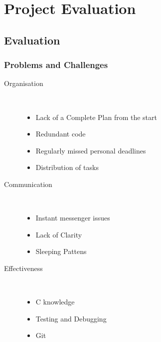 \documentclass{beamer}
\begin{document}
\section{Project Evaluation}
\subsection{Evaluation}
\begin{frame}

\frametitle{Problems and Challenges}

\begin{description}

\item[Organisation]\hfill\\
	\begin{itemize}
	\item Lack of a Complete Plan from the start
	\item Redundant code
	\item Regularly missed personal deadlines
	\item Distribution of tasks
	\end{itemize}

\item[Communication]\hfill\\
	\begin{itemize}
	\item Instant messenger issues
	\item Lack of Clarity
	\item Sleeping Pattens
	\end{itemize}

\item[Effectiveness]\hfill\\
	\begin{itemize}
	\item C knowledge
	\item Testing and Debugging
	\item Git
	\end{itemize}


\end{description}
\end{frame}
\end{document}
